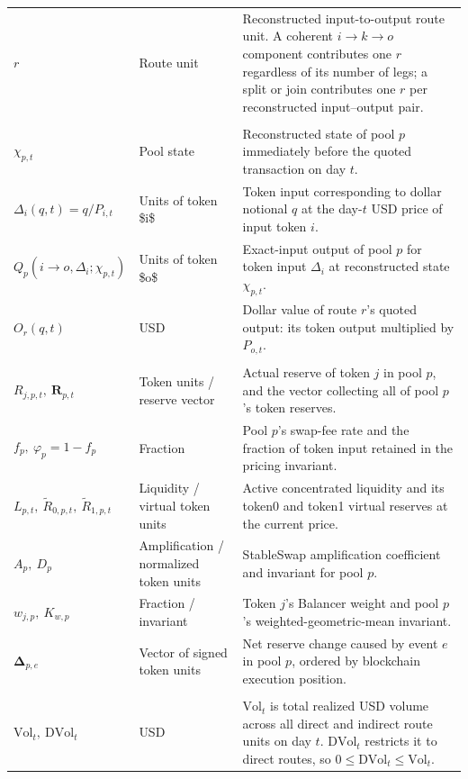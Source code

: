 \begin{tabularx}{\linewidth}{@{}>{\raggedright\arraybackslash}Xl>{\raggedright\arraybackslash}X@{}}
$r$ & Route unit & Reconstructed input-to-output route unit. A coherent $i\to k\to o$ component contributes one $r$ regardless of its number of legs; a split or join contributes one $r$ per reconstructed input--output pair. \\
\addlinespace
\multicolumn{3}{@{}l}{\textit{Quote primitives}} \\
$\chi_{p,t}$ & Pool state & Reconstructed state of pool $p$ immediately before the quoted transaction on day $t$. \\
$\Delta_i(q,t)=q/P_{i,t}$ & Units of token \$i\$ & Token input corresponding to dollar notional $q$ at the day-$t$ USD price of input token $i$. \\
$Q_p(i\to o,\Delta_i;\chi_{p,t})$ & Units of token \$o\$ & Exact-input output of pool $p$ for token input $\Delta_i$ at reconstructed state $\chi_{p,t}$. \\
$O_r(q,t)$ & USD & Dollar value of route $r$'s quoted output: its token output multiplied by $P_{o,t}$. \\
\addlinespace
\multicolumn{3}{@{}l}{\textit{Pool-state primitives}} \\
$R_{j,p,t},\ \mathbf R_{p,t}$ & Token units / reserve vector & Actual reserve of token $j$ in pool $p$, and the vector collecting all of pool $p$'s token reserves. \\
$f_p,\ \varphi_p=1-f_p$ & Fraction & Pool $p$'s swap-fee rate and the fraction of token input retained in the pricing invariant. \\
$L_{p,t},\ \widetilde R_{0,p,t},\ \widetilde R_{1,p,t}$ & Liquidity / virtual token units & Active concentrated liquidity and its token0 and token1 virtual reserves at the current price. \\
$A_p,\ D_p$ & Amplification / normalized token units & StableSwap amplification coefficient and invariant for pool $p$. \\
$w_{j,p},\ K_{w,p}$ & Fraction / invariant & Token $j$'s Balancer weight and pool $p$'s weighted-geometric-mean invariant. \\
$\boldsymbol\Delta_{p,e}$ & Vector of signed token units & Net reserve change caused by event $e$ in pool $p$, ordered by blockchain execution position. \\
\addlinespace
\multicolumn{3}{@{}l}{\textit{Route and liquidity aggregates}} \\
$\mathrm{Vol}_t,\ \mathrm{DVol}_t$ & USD & $\mathrm{Vol}_t$ is total realized USD volume across all direct and indirect route units on day $t$. $\mathrm{DVol}_t$ restricts it to direct routes, so $0\le\mathrm{DVol}_t\le\mathrm{Vol}_t$. \\

\end{tabularx}
